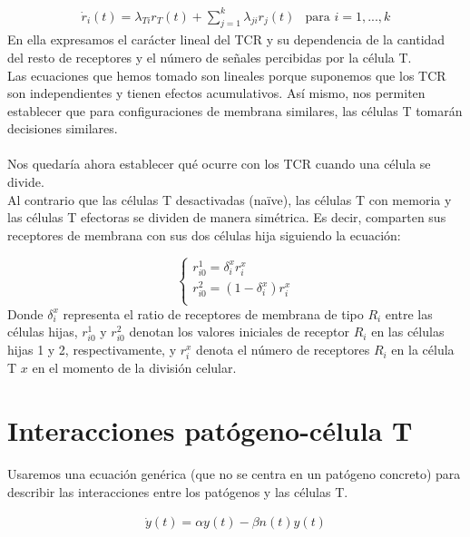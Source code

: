 \documentclass{article}
\begin{document}
	\begin{displaymath}
        \begin{array}{ll}
        \dot{r}_{i}(t) = \lambda_{Ti}r_{T}(t) + \sum_{j=1}^{k}\lambda_{ji}r_{j}(t) & \mbox{para $i=1,...,k$} 
        \end{array}
    \end{displaymath}
	En ella expresamos el carácter lineal del TCR y su dependencia de la cantidad del resto de receptores y el número de señales percibidas por la célula T. 
	\\
	Las ecuaciones que hemos tomado son lineales porque suponemos que los TCR son independientes y tienen efectos acumulativos. Así mismo, nos permiten establecer que para configuraciones de membrana similares, las células T tomarán decisiones similares.
	\\
	\\
	Nos quedaría ahora establecer qué ocurre con los TCR cuando una célula se divide. 
	\\
	Al contrario que las células T desactivadas (naïve), las células T con memoria y las células T efectoras se dividen de manera simétrica. Es decir, comparten sus receptores de membrana con sus dos células hija siguiendo la ecuación:
	
	\begin{displaymath}
         \left\{ \begin{array}{l}
        r_{i0}^{1}= \delta_{i}^{x} r_{i}^{x}\\
        r_{i0}^{2}= (1-\delta_{i}^{x}) r_{i}^{x} \\
        \end{array}
        \right.
    \end{displaymath}
	Donde $\delta_{i}^{x}$ representa el ratio de receptores de membrana de tipo $R_{i}$ entre las células hijas, $r_{i0}^{1}$ y $r_{i0}^{2}$ denotan los valores iniciales de receptor $R_{i}$ en las células hijas 1 y 2, respectivamente, y  $r_{i}^{x}$ denota el número de receptores $R_{i}$ en la célula T $x$ en el momento de la división celular.
	
	\section{Interacciones patógeno-célula T}
	Usaremos una ecuación genérica (que no se centra en un patógeno concreto) para describir las interacciones entre los patógenos y las células T.
	
	\begin{displaymath}
	\begin{array}{ll}
	\dot{y}(t) = \alpha y(t) - \beta n(t)y(t)
	\end{array}
	\end{displaymath}
	
\end{document}
